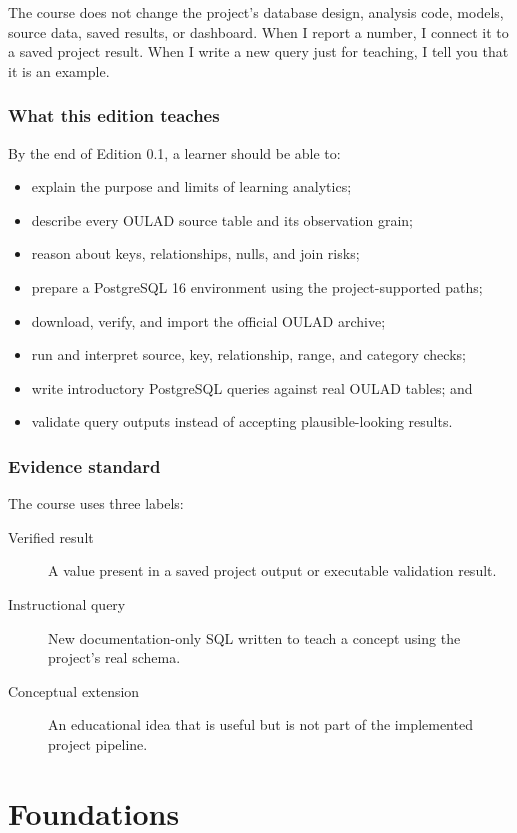 \documentclass[11pt,openany]{book}
\begin{document}
The course does not change the project's database design, analysis code,
models, source data, saved results, or dashboard. When I report a number, I
connect it to a saved project result. When I write a new query just for
teaching, I tell you that it is an example.

\section*{What this edition teaches}
By the end of Edition 0.1, a learner should be able to:
\begin{itemize}
  \item explain the purpose and limits of learning analytics;
  \item describe every OULAD source table and its observation grain;
  \item reason about keys, relationships, nulls, and join risks;
  \item prepare a PostgreSQL 16 environment using the project-supported paths;
  \item download, verify, and import the official OULAD archive;
  \item run and interpret source, key, relationship, range, and category checks;
  \item write introductory PostgreSQL queries against real OULAD tables; and
  \item validate query outputs instead of accepting plausible-looking results.
\end{itemize}

\section*{Evidence standard}
The course uses three labels:
\begin{description}
  \item[Verified result] A value present in a saved project output or executable
    validation result.
  \item[Instructional query] New documentation-only SQL written to teach a
    concept using the project's real schema.
  \item[Conceptual extension] An educational idea that is useful but is not part
    of the implemented project pipeline.
\end{description}

\tableofcontents
\listoffigures
\listoftables

\mainmatter

\part{Foundations}




\end{document}
